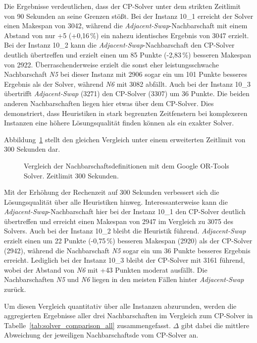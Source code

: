 Die Ergebnisse verdeutlichen, dass der CP-Solver unter dem strikten Zeitlimit von 90 Sekunden an seine Grenzen stößt.
Bei der Instanz 10\_1 erreicht der Solver einen Makespan von 3042, während die \emph{Adjacent-Swap}-Nachbarschaft mit einem Abstand von nur +5 (+0,16\,\%) ein nahezu identisches Ergebnis von 3047 erzielt.
Bei der Instanz 10\_2 kann die \emph{Adjacent-Swap}-Nachbarschaft den CP-Solver deutlich übertreffen und erzielt einen um 85 Punkte (-2,83\,\%) besseren Makespan von 2922.
Überraschenderweise erzielt die sonst eher leistungsschwache Nachbarschaft \emph{N5} bei dieser Instanz mit 2906 sogar ein um 101 Punkte besseres Ergebnis als der Solver, während \emph{N6} mit 3082 abfällt.
Auch bei der Instanz 10\_3 übertrifft \emph{Adjacent-Swap} (3271) den CP-Solver (3307) um 36 Punkte.
Die beiden anderen Nachbarschaften liegen hier etwas über dem CP-Solver.
Dies demonstriert, dass Heuristiken in stark begrenzten Zeitfenstern bei komplexeren Instanzen eine höhere Lösungsqualität finden können als ein exakter Solver.

Abbildung~\ref{fig:or_comparison_300} stellt den gleichen Vergleich unter einem erweiterten Zeitlimit von 300 Sekunden dar.

\begin{figure}[H]
    \centering
    
    \caption{Vergleich der Nachbarschaftsdefinitionen mit dem Google OR-Tools Solver. Zeitlimit 300 Sekunden.}
    \label{fig:or_comparison_300}
\end{figure}

Mit der Erhöhung der Rechenzeit auf 300 Sekunden verbessert sich die Lösungsqualität über alle Heuristiken hinweg.
Interessanterweise kann die \emph{Adjacent-Swap}-Nachbarschaft hier bei der Instanz 10\_1 den CP-Solver deutlich übertreffen und erreicht einen Makespan von 2947 im Vergleich zu 3075 des Solvers.
Auch bei der Instanz 10\_2 bleibt die Heuristik führend.
\emph{Adjacent-Swap} erzielt einen um 22 Punkte (-0,75\,\%) besseren Makespan (2920) als der CP-Solver (2942), während die Nachbarschaft \emph{N5} sogar ein um 36 Punkte besseres Ergebnis erreicht.
Lediglich bei der Instanz 10\_3 bleibt der CP-Solver mit 3161 führend, wobei der Abstand von \emph{N6} mit +43 Punkten moderat ausfällt.
Die Nachbarschaften \emph{N5} und \emph{N6} liegen in den meisten Fällen hinter \emph{Adjacent-Swap} zurück.

Um diesen Vergleich quantitativ über alle Instanzen abzurunden, werden die aggregierten Ergebnisse aller drei Nachbarschaften im Vergleich zum CP-Solver in Tabelle~\ref{tab:solver_comparison_all} zusammengefasst.
$\Delta$ gibt dabei die mittlere Abweichung der jeweiligen Nachbarschaftsde vom CP-Solver an.


